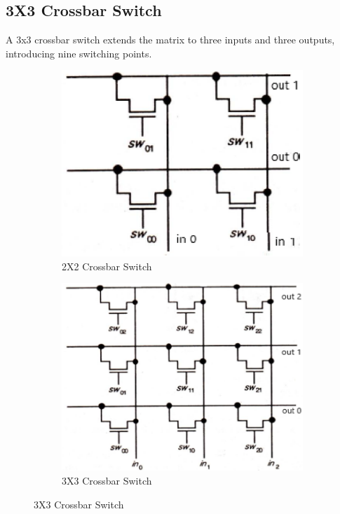 \documentclass[a4paper,12pt]{article}
\begin{document}
		\subsection{3X3 Crossbar Switch}
		A 3x3 crossbar switch extends the matrix to three inputs and three
		outputs, introducing nine switching points.
			\begin{figure}[H]
			\centering
			\begin{subfigure}[t]{0.49\textwidth}
				\centering
			\includegraphics[width=1\linewidth]{Images/1}
				\caption{2X2 Crossbar Switch}
			\end{subfigure}
			\hfill
			\begin{subfigure}[t]{0.48\textwidth}
				\centering
			\includegraphics[width=1\linewidth]{Images/2}
				\caption{ 3X3 Crossbar Switch}
			\end{subfigure}
		\end{figure}
	\newpage
\end{document}
